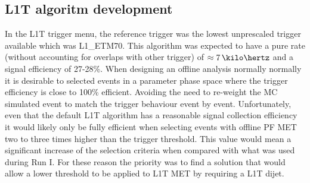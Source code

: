 \subsection{L1T algoritm development}

In the \gls{L1T} trigger menu, the reference trigger was the lowest unprescaled trigger available which was L1\_ETM70. This algorithm was expected to have a pure rate (without accounting for overlaps with other trigger) of $\approx 7\,\kilo\hertz$ and a signal efficiency of 27-28\%. When designing an offline analysis normally normally it is desirable to selected events in a parameter phase space where the trigger efficiency is close to 100\% efficient. Avoiding the need to re-weight the \gls{MC} simulated event to match the trigger behaviour event by event. Unfortunately, even that the default \gls{L1T} algorithm has a reasonable signal collection efficiency it would likely only be fully efficient when selecting events with offline \gls{PF} \gls{MET} two to three times higher than the trigger threshold. This value would mean a significant increase of the selection criteria when compared with what was used during Run I. For these reason the priority was to find a solution that would allow a lower threshold to be applied to \gls{L1T} \gls{MET} by requiring a \gls{L1T} dijet.



